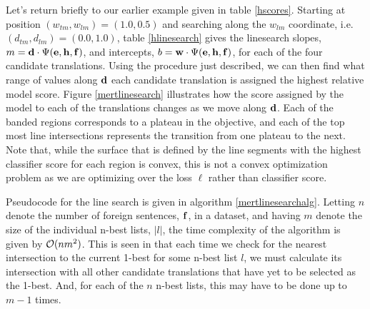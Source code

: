 \documentclass[11pt,tightenlines,kern-1pt]{article}
\begin{document}
Let's return briefly to our earlier example given in table \ref{hscores}. Starting at position \mbox{$(w_{tm}, w_{lm}) = (1.0, 0.5)$} and searching along the \mbox{$w_{lm}$} coordinate, i.e. \mbox{$(d_{tm}, d_{lm}) = (0.0, 1.0)$}, table \ref{hlinesearch} gives the linesearch slopes, \mbox{$m = {\bf d} \cdot \Psi({\bf e}, {\bf h}, {\bf f})$}, and intercepts, \mbox{$b = {\bf w} \cdot \Psi({\bf e}, {\bf h}, {\bf f})$}, for each of the four candidate translations. Using the procedure just described, we can then find what range of values along \mbox{${\bf d}$} each candidate translation is assigned the highest relative model score.  Figure \ref{mertlinesearch} illustrates how the score assigned by the model to each of the translations changes as we move along \mbox{${\bf d}$}. Each of the banded regions corresponds to a plateau in the objective, and each of the top most line intersections represents the transition from one plateau to the next. Note that, while the surface that is defined by the line segments with the highest classifier score for each region
is convex, this is not a convex optimization problem as we are optimizing over the loss $\ell$ rather than classifier score. 

Pseudocode for the line search is given in algorithm \ref{mertlinesearchalg}. Letting \mbox{$n$} denote the number of foreign sentences, \mbox{${\bf f}$}, in a dataset, and having \mbox{$m$} denote the size of the individual n-best lists, \mbox{$|l|$}, the time complexity of the algorithm is given by \mbox{${\cal O}(n m^2)$}. This is seen in that each time we check for the nearest intersection to the current 1-best for some n-best list \mbox{$l$}, we must calculate its intersection with all other candidate translations that have yet to be selected as the 1-best. And, for each of the \mbox{$n$} n-best lists, this may have to be done up to \mbox{$m-1$} times. 
\end{document}
